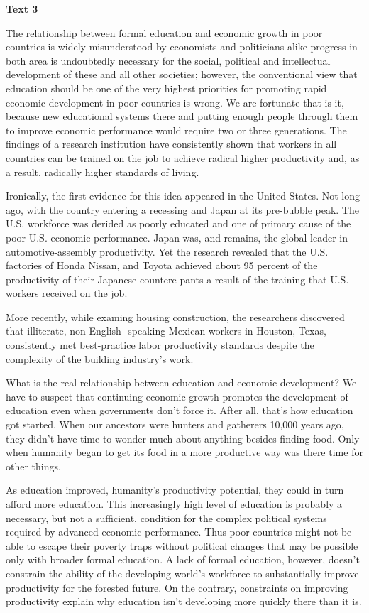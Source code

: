 \begin{center}\textbf{Text 3}\end{center}

\qquad The relationship between formal education and economic growth in poor countries is widely misunderstood by economists and politicians alike progress in both area is undoubtedly necessary for the social, political and intellectual development of these and all other societies; however, the conventional view that education should be one of the very highest priorities for promoting rapid economic development in poor countries is wrong. We are fortunate that is it, because new educational systems there and putting enough people through them to improve economic performance would require two or three generations. The findings of a research institution have consistently shown that workers in all countries can be trained on the job to achieve radical higher productivity and, as a result, radically higher standards of living.

\qquad Ironically, the first evidence for this idea appeared in the United States. Not long ago, with the country entering a recessing and Japan at its pre-bubble peak. The U.S. workforce was derided as poorly educated and one of primary cause of the poor U.S. economic performance. Japan was, and remains, the global leader in automotive-assembly productivity. Yet the research revealed that the U.S. factories of Honda Nissan, and Toyota achieved about 95 percent of the productivity of their Japanese countere pants a result of the training that U.S. workers received on the job.

\qquad More recently, while examing housing construction, the researchers discovered that illiterate, non-English- speaking Mexican workers in Houston, Texas, consistently met best-practice labor productivity standards despite the complexity of the building industry’s work.

\qquad What is the real relationship between education and economic development? We have to suspect that continuing economic growth promotes the development of education even when governments don’t force it. After all, that’s how education got started. When our ancestors were hunters and gatherers 10,000 years ago, they didn’t have time to wonder much about anything besides finding food. Only when humanity began to get its food in a more productive way was there time for other things.

\qquad As education improved, humanity’s productivity potential, they could in turn afford more education. This increasingly high level of education is probably a necessary, but not a sufficient, condition for the complex political systems required by advanced economic performance. Thus poor countries might not be able to escape their poverty traps without political changes that may be possible only with broader formal education. A lack of formal education, however, doesn’t constrain the ability of the developing world’s workforce to substantially improve productivity for the forested future. On the contrary, constraints on improving productivity explain why education isn’t developing more quickly there than it is.

